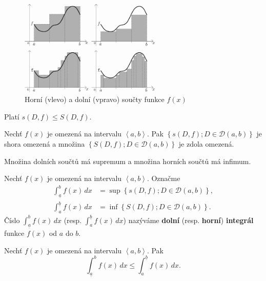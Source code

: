 \begin{figure}[ht!]
  \centering
  \includegraphics[width=0.6\textwidth]{images/riemannuv_int.png}
  \caption{Horní (vlevo) a dolní (vpravo) součty funkce $f(x)$}
\end{figure}

\begin{pozn}
    Platí $s(D,f)\leq S(D,f).$
\end{pozn}

\begin{veta}
Nechť $f(x)$ je omezená na intervalu $\left < a,b \right >. $ Pak
$\left \{ s(D,f); D\in \mathscr D(a,b) \right \} $ je shora omezená a množina
$\left \{ S(D,f); D\in \mathscr D(a,b) \right \} $ je zdola omezená.
\end{veta}

\begin{pozn}
     Množina dolních součtů má supremum a množina horních součtů má infimum.
\end{pozn}

\begin{definition}
Nechť $f(x)$ je omezená na intervalu $\left < a,b \right > .$ Označme
\begin{align*}
    \int_{\underline{a}} ^b f(x) \, dx & = \sup \left \{ s(D,f); D \in \mathscr D(a,b) \right \}, \\
    \int_{a} ^{\underline{b}} f(x) \, dx & = \inf \left \{ S(D,f); D \in \mathscr D(a,b) \right \}.
\end{align*}
Číslo $\int_{\underline{a}} ^b f(x)\, dx$ (resp. $\int_{a} ^{\underline{b}} f(x) \, dx$)
nazýváme \textbf{dolní} (resp. \textbf{horní}) \textbf{integrál} funkce $f(x)$ od
$a$ do $b$.
\end{definition}

\begin{veta}
Nechť $f(x)$ je omezená na intervalu $\left < a,b \right >. $ Pak
$$\int_{\underline{a}} ^b f(x)\, dx \leq \int_{a} ^{\underline{b}} f(x) \, dx.$$
\end{veta}

